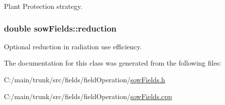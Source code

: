 Plant Protection strategy. \hypertarget{classsow_fields_a963b55ec84f8451164ee615b1fa52927}{
\subsubsection[{reduction}]{\setlength{\rightskip}{0pt plus 5cm}double {\bf sowFields::reduction}}}
\label{classsow_fields_a963b55ec84f8451164ee615b1fa52927}


Optional reduction in radiation use efficiency. 

The documentation for this class was generated from the following files:\begin{DoxyCompactItemize}
\item 
C:/main/trunk/src/fields/fieldOperation/\hyperlink{sow_fields_8h}{sowFields.h}\item 
C:/main/trunk/src/fields/fieldOperation/\hyperlink{sow_fields_8cpp}{sowFields.cpp}\end{DoxyCompactItemize}
